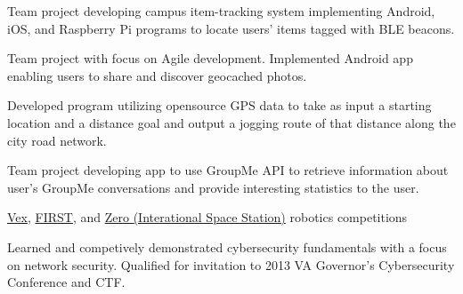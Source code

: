\documentclass[11pt,letterpaper,serif]{moderncv}
\begin{document}
{
	\begin{adjustwidth}{.25in}{}
		Team project developing campus item-tracking system implementing Android, iOS, and Raspberry Pi programs to locate users' items tagged with BLE beacons.
	\end{adjustwidth}
}

{
	\begin{adjustwidth}{.25in}{}
		Team project with focus on Agile development. Implemented Android app enabling users to share and discover geocached photos.
	\end{adjustwidth}
}

{
	\begin{adjustwidth}{.25in}{}
		Developed program utilizing opensource GPS data to take as input a starting location and a distance goal and output a jogging route of that distance along the city road network.
	\end{adjustwidth}
}

{
	\begin{adjustwidth}{.25in}{}
		Team project developing app to use GroupMe API to retrieve information about user's GroupMe conversations and provide interesting statistics to the user.
	\end{adjustwidth}
}

{\href{https://www.vexrobotics.com/vexedr/competition}{Vex}, \href{https://www.firstinspires.org/robotics/ftc}{FIRST}, and \href{http://zerorobotics.mit.edu/}{Zero {\footnotesize (Interational Space Station)}} robotics competitions}
{}{}{}


{
	\begin{adjustwidth}{.25in}{}
		 Learned and competively demonstrated cybersecurity fundamentals with a focus on network security. \newline
		 Qualified for invitation to 2013 VA Governor's Cybersecurity Conference and CTF.
	\end{adjustwidth}
}

\end{document}
